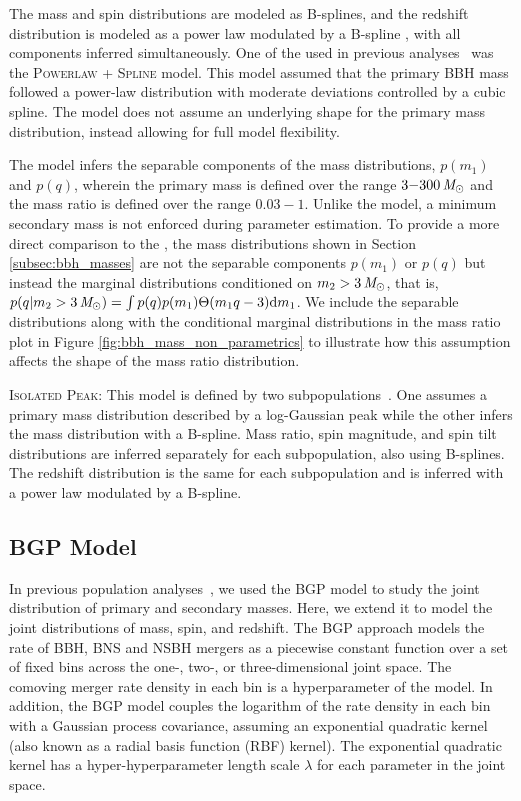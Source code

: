 The mass and spin distributions are modeled as B-splines, and the redshift distribution is modeled as a power law modulated by a B-spline \citep{Edelman:2022ydv}, with all components inferred simultaneously.
One of the \nonparametrics used in previous analyses~\citep{KAGRA:2021duu} was the \textsc{Powerlaw + Spline} model. This model assumed that the primary BBH mass followed a power-law distribution with moderate deviations controlled by a cubic spline.
The \BSpline model does not assume an underlying shape for the primary mass distribution, instead allowing for full model flexibility.

The \BSpline model infers the separable components of the mass distributions, $p(m_1)$ and $p(q)$, wherein the primary mass is defined over the range $3{-}300 \, \mathit{M_\odot}$ and the mass ratio is defined over the range $0.03{-}1$. Unlike the \BrokenPLTwoPeaks model, a minimum secondary mass is not enforced during parameter estimation. To provide a more direct comparison to the \parametric, the \BSpline mass distributions shown in Section \ref{subsec:bbh_masses} are not the separable components $p(m_1)$ or $p(q)$ but instead the marginal distributions conditioned on $m_2 > 3 \, \mathit{M_\odot}$, that is, $p(q|m_2 > 3 \, \mathit{M_\odot}) = \int p(q)p(m_1)\Theta(m_1q-3)\mathrm{d}m_1$. We include the separable distributions along with the conditional marginal distributions in the mass ratio plot in Figure \ref{fig:bbh_mass_non_parametrics} to illustrate how this assumption affects the shape of the mass ratio distribution. 

\textsc{Isolated Peak}: This model is defined by two subpopulations~\citep{Godfrey:2023oxb}. One assumes a primary mass distribution described by a log-Gaussian peak while the other infers the mass distribution with a B-spline. Mass ratio, spin magnitude, and spin tilt distributions are inferred separately for each subpopulation, also using B-splines. The redshift distribution is the same for each subpopulation and is inferred with a power law modulated by a B-spline. 

\subsection{\acf{BGP} Model}\label{appendix:BGPModel}

In previous population analyses~\citep{KAGRA:2021duu}, we used the \ac{BGP} model to study the joint distribution of primary and secondary masses. Here, we extend it to model the joint distributions of mass, spin, and redshift.
The \ac{BGP} approach models the rate of \ac{BBH}, \ac{BNS} and \ac{NSBH} mergers as a piecewise constant function over a set of fixed bins across the one-, two-, or three-dimensional joint space. 
The comoving merger rate density in each bin is a hyperparameter of the model.
In addition, the \ac{BGP} model couples the logarithm of the rate density in each bin with a Gaussian process covariance, assuming an exponential quadratic kernel (also known as a radial basis function (RBF) kernel). 
The exponential quadratic kernel has a hyper-hyperparameter length scale $\lambda$ for each parameter in the joint space.

